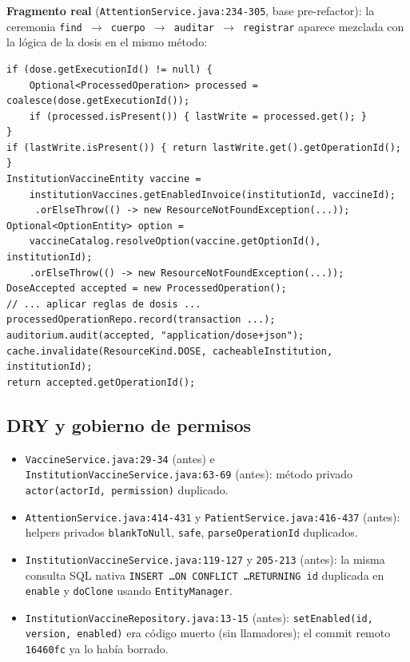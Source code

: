\documentclass[11pt,a4paper]{article}
\begin{document}
\textbf{Fragmento real} (\texttt{AttentionService.java:234-305}, base pre-refactor):
la ceremonia \texttt{find $\to$ cuerpo $\to$ auditar $\to$ registrar} aparece
mezclada con la lógica de la dosis en el mismo método:

\begin{lstlisting}
if (dose.getExecutionId() != null) {
    Optional<ProcessedOperation> processed = coalesce(dose.getExecutionId());
    if (processed.isPresent()) { lastWrite = processed.get(); }
}
if (lastWrite.isPresent()) { return lastWrite.get().getOperationId(); }
InstitutionVaccineEntity vaccine =
    institutionVaccines.getEnabledInvoice(institutionId, vaccineId);
     .orElseThrow(() -> new ResourceNotFoundException(...));
Optional<OptionEntity> option =
    vaccineCatalog.resolveOption(vaccine.getOptionId(), institutionId);
    .orElseThrow(() -> new ResourceNotFoundException(...));
DoseAccepted accepted = new ProcessedOperation();
// ... aplicar reglas de dosis ...
processedOperationRepo.record(transaction ...);
auditorium.audit(accepted, "application/dose+json");
cache.invalidate(ResourceKind.DOSE, cacheableInstitution, institutionId);
return accepted.getOperationId();
\end{lstlisting}

\subsection{DRY y gobierno de permisos}

\begin{itemize}
  \item \texttt{VaccineService.java:29-34} (antes) e
        \texttt{InstitutionVaccineService.java:63-69} (antes):
        método privado \texttt{actor(actorId, permission)} duplicado.
  \item \texttt{AttentionService.java:414-431} y \texttt{PatientService.java:416-437}
        (antes): helpers privados \texttt{blankToNull}, \texttt{safe},
        \texttt{parseOperationId} duplicados.
  \item \texttt{InstitutionVaccineService.java:119-127} y \texttt{205-213}
        (antes): la misma consulta SQL nativa
        \texttt{INSERT \ldots ON CONFLICT \ldots RETURNING id} duplicada en
        \texttt{enable} y \texttt{doClone} usando \texttt{EntityManager}.
  \item \texttt{InstitutionVaccineRepository.java:13-15} (antes):
        \texttt{setEnabled(id, version, enabled)} era código muerto (sin
        llamadores); el commit remoto \texttt{16460fc} ya lo había borrado.
\end{itemize}
\end{document}
